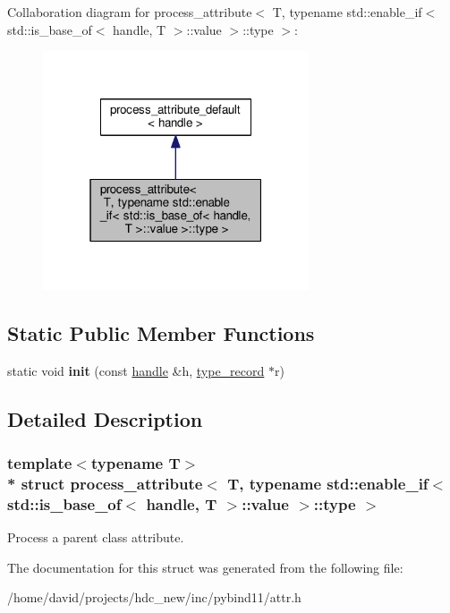 Collaboration diagram for process\+\_\+attribute$<$ T, typename std\+:\+:enable\+\_\+if$<$ std\+:\+:is\+\_\+base\+\_\+of$<$ handle, T $>$\+:\+:value $>$\+:\+:type $>$\+:
\nopagebreak
\begin{figure}[H]
\begin{center}
\leavevmode
\includegraphics[width=223pt]{structprocess__attribute_3_01_t_00_01typename_01std_1_1enable__if_3_01std_1_1is__base__of_3_01ha83ea40cffaca6c039a0af90f9dca168d}
\end{center}
\end{figure}
\subsection*{Static Public Member Functions}
\begin{DoxyCompactItemize}
\item 
static void {\bfseries init} (const \hyperlink{classhandle}{handle} \&h, \hyperlink{structtype__record}{type\+\_\+record} $\ast$r)\hypertarget{structprocess__attribute_3_01_t_00_01typename_01std_1_1enable__if_3_01std_1_1is__base__of_3_01hac52f26afeeb97d5e0622f449789fb756_aa3f3e05fb7d298cd1bb0f6bf70fd3c52}{}\label{structprocess__attribute_3_01_t_00_01typename_01std_1_1enable__if_3_01std_1_1is__base__of_3_01hac52f26afeeb97d5e0622f449789fb756_aa3f3e05fb7d298cd1bb0f6bf70fd3c52}

\end{DoxyCompactItemize}


\subsection{Detailed Description}
\subsubsection*{template$<$typename T$>$\\*
struct process\+\_\+attribute$<$ T, typename std\+::enable\+\_\+if$<$ std\+::is\+\_\+base\+\_\+of$<$ handle, T $>$\+::value $>$\+::type $>$}

Process a parent class attribute. 

The documentation for this struct was generated from the following file\+:\begin{DoxyCompactItemize}
\item 
/home/david/projects/hdc\+\_\+new/inc/pybind11/attr.\+h\end{DoxyCompactItemize}
